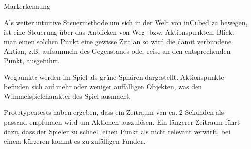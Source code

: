 Markerkennung


Als weiter intuitive Steuermethode um sich in der Welt von inCubed zu bewegen, ist eine Steuerung über das Anblicken von Weg- bzw. Aktionspunkten. Blickt man einen solchen Punkt eine gewisse Zeit an so wird die damit verbundene Aktion, z.B. aufsammeln des Gegenstands oder reise an den entsprechenden Punkt, ausgeführt.

Wegpunkte werden im Spiel als grüne Sphären dargestellt. Aktionspunkte befinden sich auf mehr oder weniger auffälligen Objekten, was den Wimmelspielcharakter des Spiel ausmacht.

Prototypentests haben ergeben, dass ein Zeitraum von ca. 2 Sekunden als passend empfunden wird um Aktionen auszulösen. Ein längerer Zeitraum führt dazu, dass der Spieler zu schnell einen Punkt als nicht relevant verwirft, bei einem kürzeren kommt es zu zufälligen Funden.
